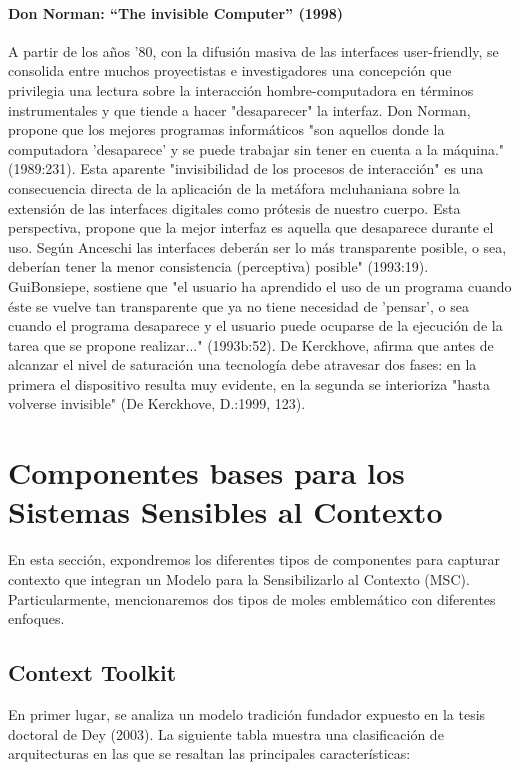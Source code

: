 \paragraph {Don Norman: “The invisible Computer” (1998)}

A partir de los años ’80, con la difusión masiva de las interfaces user-friendly, se consolida entre muchos proyectistas e investigadores una concepción que privilegia una lectura sobre la interacción hombre-computadora en términos instrumentales y que tiende a hacer "desaparecer" la interfaz. Don Norman, propone que los mejores programas informáticos "son aquellos donde la computadora 'desaparece’ y se puede trabajar sin tener en cuenta a la máquina." (1989:231). Esta aparente "invisibilidad de los procesos de interacción" es una consecuencia directa de la aplicación de la metáfora mcluhaniana sobre la extensión de las interfaces digitales como prótesis de nuestro
cuerpo. Esta perspectiva, propone que la mejor interfaz es aquella que desaparece durante el uso. Según Anceschi las interfaces deberán ser lo más transparente posible, o sea, deberían tener la menor consistencia (perceptiva) posible" (1993:19). GuiBonsiepe, sostiene que "el usuario ha aprendido el uso de un programa cuando éste se
vuelve tan transparente que ya no tiene necesidad de 'pensar’, o sea cuando el programa desaparece y el usuario puede ocuparse de la ejecución de la tarea que se propone realizar..." (1993b:52). De Kerckhove, afirma que antes de alcanzar el nivel de saturación una tecnología debe atravesar dos fases: en la primera el dispositivo
resulta muy evidente, en la segunda se interioriza "hasta volverse invisible" (De Kerckhove, D.:1999, 123).

\section{Componentes bases para los Sistemas Sensibles al Contexto}\label{requisitoDHD}
  
En esta sección, expondremos los diferentes tipos de componentes para capturar contexto que integran un Modelo para la Sensibilizarlo al Contexto (MSC). Particularmente, mencionaremos dos tipos de moles emblemático con diferentes enfoques.

\subsection{Context Toolkit}

En primer lugar, se analiza un modelo tradición fundador expuesto en la tesis doctoral de Dey (2003)\cite{dey}. La siguiente tabla muestra una clasificación de arquitecturas en las que se resaltan las principales características:

